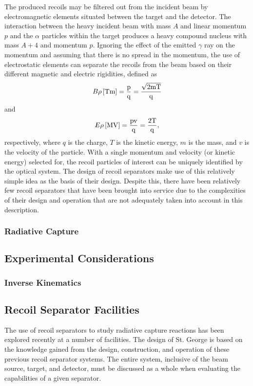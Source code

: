 The produced recoils may be filtered out from the incident beam by
electromagnetic elements situated between the target and the detector. The
interaction between the heavy incident beam with mass $A$ and linear momentum
$p$ and the $\alpha$ particles within
the target produces a heavy compound nucleus with mass $A + 4$ and momentum
$p$. Ignoring the effect of the emitted $\gamma$ ray on the momentum and
assuming that there is no spread in the momentum, the use of electrostatic
elements can separate the recoils from the beam based on their different
magnetic and electric rigidities, defined as
\[
    B\rho\,\rm{[Tm]} = \frac{p}{q} = \frac{\sqrt{2mT}}{q}
\]
and
\[
    E\rho\,\rm{[MV]} = \frac{pv}{q} = \frac{2T}{q},
\]
respectively, where $q$ is the charge, $T$ is the kinetic energy, $m$ is the
mass, and $v$ is the velocity of the particle. With a single momentum and
velocity (or kinetic energy) selected for, the recoil particles of interest can
be uniquely identified by the optical system. The design of recoil separators
make use of this relatively simple idea as the basis of their design. Despite
this, there have been relatively few recoil separators that have been brought
into service due to the complexities of their design and operation that are not
adequately taken into account in this description.

\subsubsection{Radiative Capture}
\subsection{Experimental Considerations}
\subsubsection{Inverse Kinematics}
\subsection{Recoil Separator Facilities}
The use of recoil separators to study radiative capture reactions has been
explored recently at a number of facilities. The design of St. George is based
on the knowledge gained from the design, construction, and operation of these
previous recoil separator systems. The entire system, inclusive of the beam
source, target, and detector, must be discussed as a whole when evaluating the
capabilities of a given separator.

